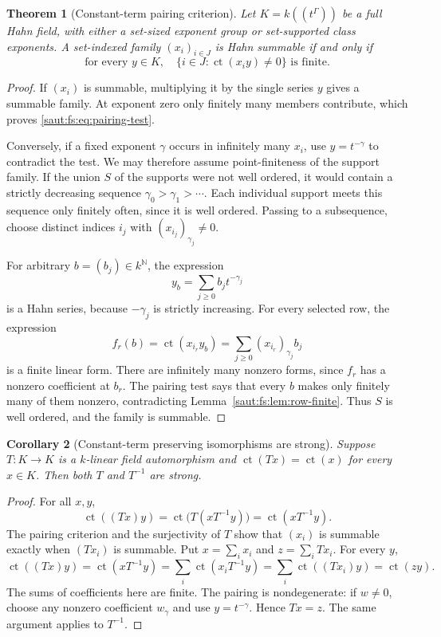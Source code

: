 \documentclass[11pt]{article}
\newtheorem{theorem}{Theorem}[section]
\newtheorem{corollary}[theorem]{Corollary}
\theoremstyle{definition}
\theoremstyle{remark}
\newcommand{\N}{\mathbb N}
\newcommand{\ct}{\operatorname{ct}}
\numberwithin{equation}{section}
\begin{document}
\begin{theorem}[Constant-term pairing criterion]\label{saut:fs:thm:pairing}
Let $K=k((t^\Gamma))$ be a full Hahn field, with either a set-sized exponent group or
set-supported class exponents. A set-indexed family $(x_i)_{i\in J}$ is Hahn summable
if and only if
\begin{equation}\label{saut:fs:eq:pairing-test}
 \text{for every }y\in K,\quad
 \{i\in J:\ct(x_i y)\ne0\}\text{ is finite}.
\end{equation}
\end{theorem}
\begin{proof}
If $(x_i)$ is summable, multiplying it by the single series $y$ gives a summable
family. At exponent zero only finitely many members contribute, which proves
\eqref{saut:fs:eq:pairing-test}.

Conversely, if a fixed exponent $\gamma$ occurs in infinitely many $x_i$, use
$y=t^{-\gamma}$ to contradict the test. We may therefore assume point-finiteness of
the support family. If the union $S$ of the supports were not well ordered, it
would contain a strictly decreasing sequence $\gamma_0>\gamma_1>\cdots$. Each
individual support meets this sequence only finitely often, since it is well
ordered. Passing to a subsequence, choose distinct indices $i_j$ with
$(x_{i_j})_{\gamma_j}\ne0$.

For arbitrary $b=(b_j)\in k^{\N}$, the expression
\[
 y_b=\sum_{j\ge0}b_jt^{-\gamma_j}
\]
is a Hahn series, because $-\gamma_j$ is strictly increasing. For every selected row,
the expression
\[
 f_r(b)=\ct(x_{i_r}y_b)=\sum_{j\ge0}(x_{i_r})_{\gamma_j}b_j
\]
is a finite linear form. There are infinitely many nonzero forms, since $f_r$ has a
nonzero coefficient at $b_r$. The pairing test says that every $b$ makes only
finitely many of them nonzero, contradicting Lemma~\ref{saut:fs:lem:row-finite}.
Thus $S$ is well ordered, and the family is summable.
\end{proof}

\begin{corollary}[Constant-term preserving isomorphisms are strong]\label{saut:fs:cor:ct-strong}
Suppose $T:K\to K$ is a $k$-linear field automorphism and $\ct(Tx)=\ct(x)$ for every
$x\in K$. Then both $T$ and $T^{-1}$ are strong.
\end{corollary}
\begin{proof}
For all $x,y$,
\[
 \ct((Tx)y)=\ct\bigl(T(xT^{-1}y)\bigr)=\ct(xT^{-1}y).
\]
The pairing criterion and the surjectivity of $T$ show that $(x_i)$ is summable
exactly when $(Tx_i)$ is summable. Put $x=\sum_i x_i$ and $z=\sum_iTx_i$. For every
$y$,
\[
 \ct((Tx)y)=\ct(xT^{-1}y)=\sum_i\ct(x_iT^{-1}y)=\sum_i\ct((Tx_i)y)=\ct(zy).
\]
The sums of coefficients here are finite. The pairing is nondegenerate: if $w\ne0$,
choose any nonzero coefficient $w_\gamma$ and use $y=t^{-\gamma}$. Hence $Tx=z$. The
same argument applies to $T^{-1}$.
\end{proof}
\end{document}
